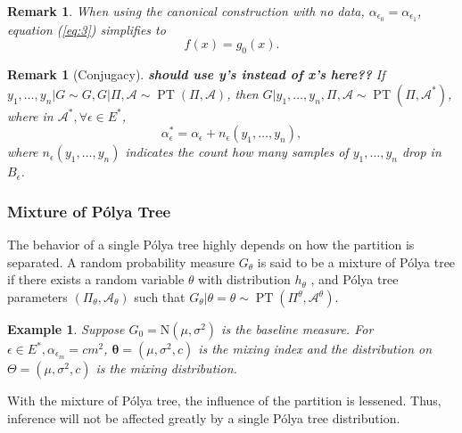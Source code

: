 \documentclass[12pt]{article}
\newtheorem{rmk}[thm]{Remark}
\newtheorem{emp}[thm]{Example}
\newcommand{\polya}{P\'{o}lya}
\DeclareMathOperator{\pt}{PT}
\begin{document}
\begin{rmk}
  When using the canonical construction with no data,
  $\alpha_{\epsilon_0 } = \alpha_{\epsilon_1}$, equation (\ref{eq:3})
  simplifies to 
  \begin{displaymath}
    f(x) = g_0(x).
  \end{displaymath}
\end{rmk}

\begin{rmk}[Conjugacy]
{\bf should use y's instead of x's here??}  If $y_1, \ldots, y_n | G \sim G, G|\Pi, \mathcal{A} \sim \pt (\Pi,
  \mathcal{A})$, then $G|y_1, \ldots, y_n , \Pi, \mathcal{A} \sim \pt
  (\Pi, \mathcal{A}^{*})$, where in $\mathcal{A}^{*}, \forall \epsilon
  \in E^{*}$, 
  \begin{displaymath}
    \alpha_{\epsilon}^{*} = \alpha_{\epsilon} + n_{\epsilon}(y_1, \ldots, y_n),
  \end{displaymath}
  where $n_{\epsilon}(y_1, \ldots, y_n)$ indicates the count how many
  samples of $y_1, \ldots, y_n$ drop in $B_{\epsilon}$. 
\end{rmk}

\subsubsection{Mixture of \polya{} Tree}
The behavior of a single \polya{} tree highly depends on how the
partition is separated. A random probability measure $G_\theta$ is
said to be a mixture of \polya{} tree if there exists a random
variable $\theta$ with distribution $h_{\theta}$ , and \polya{} tree
parameters $(\Pi_{\theta}, \mathcal{A}_{\theta})$ such that
$G_{\theta} | \theta=\theta \sim \pt (\Pi^{\theta},
\mathcal{A}^{\theta})$.

\begin{emp}
  Suppose $G_0 = \mathrm{N}(\mu, \sigma^2)$ is the baseline measure.
  For $\epsilon \in E^{*}, \alpha_{\epsilon_m} = cm^2 $, 
  $\bm{\theta}= (\mu, \sigma^2, c)$ is the mixing index and the
  distribution on $\Theta = (\mu, \sigma^2, c) $ is the mixing
  distribution. 
\end{emp}
With the mixture of \polya{} tree, the influence of the partition
is lessened. Thus, inference will not be affected greatly by a single
\polya{} tree distribution. 
\end{document}
